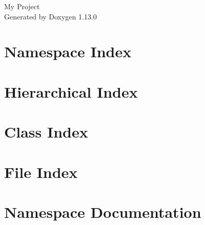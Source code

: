 \documentclass[twoside]{book}
\newcommand{\+}{\discretionary{\mbox{\scriptsize$\hookleftarrow$}}{}{}}
\newcommand{\clearemptydoublepage}{%
    \newpage{\pagestyle{empty}\cleardoublepage}%
  }
\begin{document}
  \raggedbottom
    \hypersetup{pageanchor=false,
                bookmarksnumbered=true,
                pdfencoding=unicode
               }
  \begin{titlepage}
  \vspace*{7cm}
  \begin{center}%
  {\Large My Project}\\
  \vspace*{1cm}
  {\large Generated by Doxygen 1.13.0}\\
  \end{center}
  \end{titlepage}
  \clearemptydoublepage
  \tableofcontents
  \clearemptydoublepage
  \hypersetup{pageanchor=true}



\chapter{Namespace Index}

\chapter{Hierarchical Index}

\chapter{Class Index}

\chapter{File Index}

\chapter{Namespace Documentation}













\end{document}
